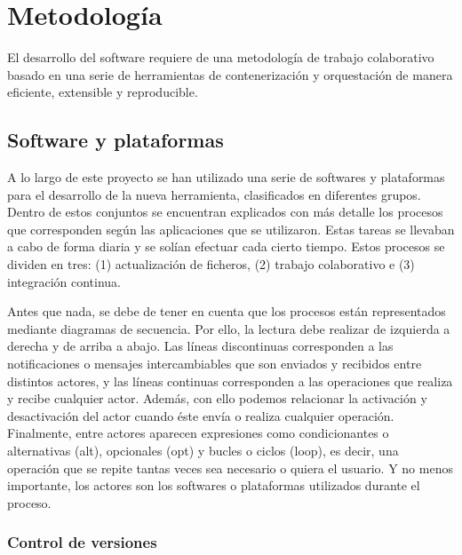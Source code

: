 
\chapter{Metodología}
El desarrollo del software requiere de una metodología de trabajo colaborativo basado en una serie de herramientas de contenerización y orquestación de manera eficiente, extensible y reproducible.

\section{Software y plataformas}
A lo largo de este proyecto se han utilizado una serie de softwares y plataformas para el desarrollo de la nueva herramienta, clasificados en diferentes grupos. Dentro de estos conjuntos se encuentran explicados con más detalle los procesos que corresponden según las aplicaciones que se utilizaron.  Estas tareas se llevaban a cabo de forma diaria y se solían efectuar cada cierto tiempo. Estos procesos se dividen en tres: (1) actualización de ficheros, (2) trabajo colaborativo e (3) integración continua.

Antes que nada, se debe de tener en cuenta que los procesos están representados mediante diagramas de secuencia. Por ello, la lectura debe realizar de izquierda a derecha y de arriba a abajo. Las líneas discontinuas corresponden a las notificaciones o mensajes intercambiables que son enviados y recibidos entre distintos actores, y las líneas continuas corresponden a las operaciones que realiza y recibe cualquier actor. Además, con ello podemos relacionar la activación y desactivación del actor cuando éste envía o realiza cualquier operación. Finalmente, entre actores aparecen expresiones como condicionantes o alternativas (alt), opcionales (opt) y bucles o ciclos (loop), es decir, una operación que se repite tantas veces sea necesario o quiera el usuario. Y no menos importante, los actores son los softwares o plataformas utilizados durante el proceso.

\subsection{Control de versiones}

